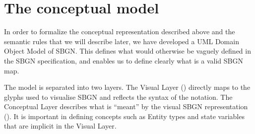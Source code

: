\section{The conceptual model}

In order to formalize the conceptual representation described above
and the semantic rules that we will describe later, we have developed a UML
Domain Object Model of SBGN\@. This defines what would otherwise be
vaguely defined in the SBGN specification, and enables us to define
clearly what is a valid SBGN map.

The model is separated into two layers. The Visual Layer
() directly maps to the glyphs used to
visualise SBGN and reflects the syntax of the notation. The Conceptual
Layer describes what is ``meant'' by the visual SBGN representation
(). It is important in defining
concepts such as Entity types and state variables that are implicit in the Visual Layer.

